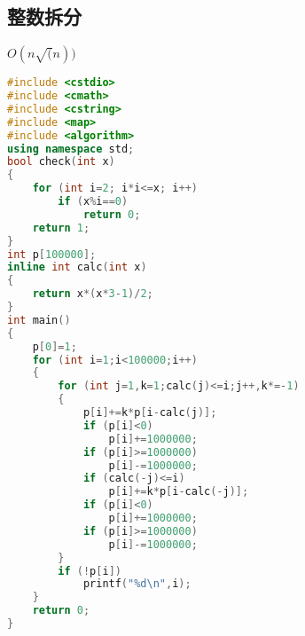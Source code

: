 \subsection{整数拆分}
$O(n\sqrt(n))$
	\begin{lstlisting}[language=c++]
#include <cstdio>
#include <cmath>
#include <cstring>
#include <map>
#include <algorithm>
using namespace std;
bool check(int x)
{
	for (int i=2; i*i<=x; i++)
		if (x%i==0)
			return 0;
	return 1;
}
int p[100000];
inline int calc(int x)
{
	return x*(x*3-1)/2;
}
int main()
{
	p[0]=1;
	for (int i=1;i<100000;i++)
	{
		for (int j=1,k=1;calc(j)<=i;j++,k*=-1)
		{
			p[i]+=k*p[i-calc(j)];
			if (p[i]<0)
				p[i]+=1000000;
			if (p[i]>=1000000)
				p[i]-=1000000;
			if (calc(-j)<=i)
				p[i]+=k*p[i-calc(-j)];
			if (p[i]<0)
				p[i]+=1000000;
			if (p[i]>=1000000)
				p[i]-=1000000;
		}
		if (!p[i])
			printf("%d\n",i);
	}
	return 0;
}
	\end{lstlisting}
